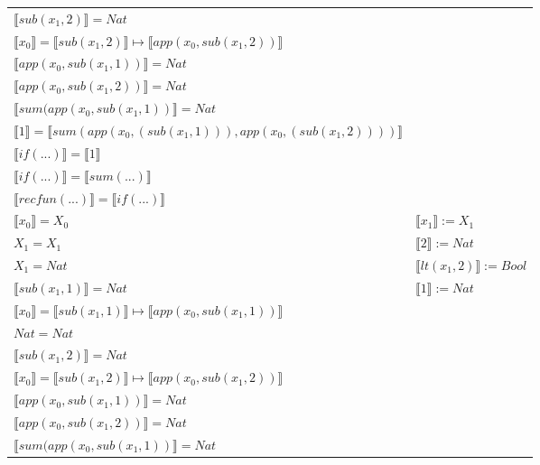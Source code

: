 \begin{exercise}
\begin{description}
\begin{center}
\begin{longtable}[!h]{ | l | l | }
                        $ \llbracket sub(x_1,2) \rrbracket = Nat$ & \\
                        $ \llbracket x_0 \rrbracket = \llbracket sub(x_1,2) \rrbracket \mapsto  \llbracket app(x_0, sub(x_1,2)) \rrbracket$ & \\
                        $ \llbracket app(x_0, sub(x_1,1)) \rrbracket = Nat$ & \\
                        $ \llbracket app(x_0, sub(x_1,2)) \rrbracket = Nat$ & \\
                        $ \llbracket sum(app(x_0, sub(x_1,1)) \rrbracket = Nat$ & \\
                        $ \llbracket 1 \rrbracket =  \llbracket sum(app(x_0, (sub(x_1,1))), app(x_0, (sub(x_1,2)))) \rrbracket$ & \\
                        $ \llbracket if(...) \rrbracket =  \llbracket 1 \rrbracket$ & \\
                        $ \llbracket if(...) \rrbracket =  \llbracket sum(...) \rrbracket$ & \\
                        $ \llbracket recfun(...) \rrbracket =  \llbracket if(...) \rrbracket$ & \\
                    \hline
                        $ \llbracket x_0 \rrbracket = X_0$ & $ \llbracket x_1 \rrbracket := X_1$ \\
                        $X_1 = X_1$ & $ \llbracket 2 \rrbracket := Nat$ \\
                        $X_1 = Nat$ & $ \llbracket lt(x_1 , 2) \rrbracket := Bool$ \\
                        $ \llbracket sub(x_1,1) \rrbracket = Nat$ & $ \llbracket 1 \rrbracket := Nat$ \\
                        $ \llbracket x_0 \rrbracket =  \llbracket sub(x_1,1) \rrbracket \mapsto  \llbracket app(x_0, sub(x_1,1)) \rrbracket$ & \\
                        $Nat = Nat$ & \\
                        $ \llbracket sub(x_1,2) \rrbracket = Nat$ & \\
                        $ \llbracket x_0 \rrbracket = \llbracket sub(x_1,2) \rrbracket \mapsto  \llbracket app(x_0, sub(x_1,2)) \rrbracket$ & \\
                        $ \llbracket app(x_0, sub(x_1,1)) \rrbracket = Nat$ & \\
                        $ \llbracket app(x_0, sub(x_1,2)) \rrbracket = Nat$ & \\
                        $ \llbracket sum(app(x_0, sub(x_1,1)) \rrbracket = Nat$ & \\

\end{longtable}
\end{center}
\end{description}
\end{exercise}
